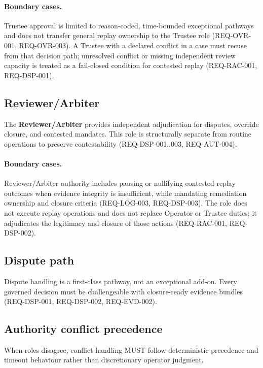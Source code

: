 \documentclass[11pt]{article}
\theoremstyle{definition}
\theoremstyle{plain}
\theoremstyle{remark}
\begin{document}
\paragraph{Boundary cases.}
Trustee approval is limited to reason-coded, time-bounded exceptional pathways and does not transfer
general replay ownership to the Trustee role (REQ-OVR-001, REQ-OVR-003). A Trustee with a declared
conflict in a case must recuse from that decision path; unresolved conflict or missing independent
review capacity is treated as a fail-closed condition for contested replay (REQ-RAC-001, REQ-DSP-001).

\subsection{Reviewer/Arbiter}
The \textbf{Reviewer/Arbiter} provides independent adjudication for disputes, override closure, and contested mandates.
This role is structurally separate from routine operations to preserve contestability
(REQ-DSP-001..003, REQ-AUT-004).

\paragraph{Boundary cases.}
Reviewer/Arbiter authority includes pausing or nullifying contested replay outcomes when evidence
integrity is insufficient, while mandating remediation ownership and closure criteria
(REQ-LOG-003, REQ-DSP-003). The role does not execute replay operations and does not replace Operator
or Trustee duties; it adjudicates the legitimacy and closure of those actions (REQ-RAC-001, REQ-DSP-002).

\subsection{Dispute path}
Dispute handling is a first-class pathway, not an exceptional add-on.
Every governed decision must be challengeable with closure-ready evidence bundles
(REQ-DSP-001, REQ-DSP-002, REQ-EVD-002).

\subsection{Authority conflict precedence}
\label{sec:authority-precedence}
When roles disagree, conflict handling MUST follow deterministic precedence and timeout behaviour
rather than discretionary operator judgment.
\end{document}
